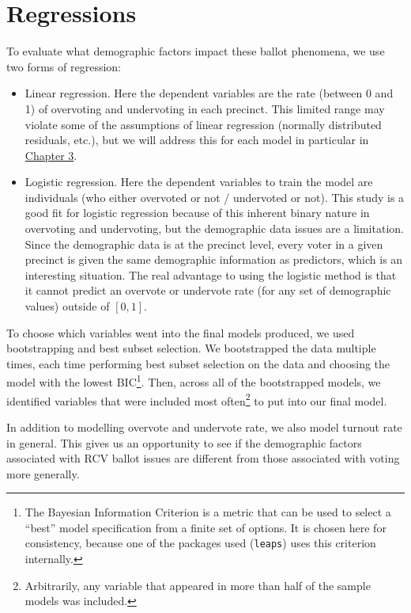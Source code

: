 \documentclass[12pt,twoside]{reedthesis}
\begin{document}
\hypertarget{regressions}{%
\section{Regressions}\label{regressions}}

To evaluate what demographic factors impact these ballot phenomena, we use two forms of regression:
\begin{itemize}
\item
  Linear regression. Here the dependent variables are the rate (between 0 and 1) of overvoting and undervoting in each precinct. This limited range may violate some of the assumptions of linear regression (normally distributed residuals, etc.), but we will address this for each model in particular in \protect\hyperlink{demo-results}{Chapter 3}.
\item
  Logistic regression. Here the dependent variables to train the model are individuals (who either overvoted or not / undervoted or not). This study is a good fit for logistic regression because of this inherent binary nature in overvoting and undervoting, but the demographic data issues are a limitation. Since the demographic data is at the precinct level, every voter in a given precinct is given the same demographic information as predictors, which is an interesting situation. The real advantage to using the logistic method is that it cannot predict an overvote or undervote rate (for any set of demographic values) outside of \([0,1]\).
\end{itemize}
To choose which variables went into the final models produced, we used bootstrapping and best subset selection. We bootstrapped the data multiple times, each time performing best subset selection on the data and choosing the model with the lowest BIC\footnote{The Bayesian Information Criterion is a metric that can be used to select a ``best'' model specification from a finite set of options. It is chosen here for consistency, because one of the packages used (\texttt{leaps}) uses this criterion internally.}. Then, across all of the bootstrapped models, we identified variables that were included most often\footnote{Arbitrarily, any variable that appeared in more than half of the sample models was included.} to put into our final model.

In addition to modelling overvote and undervote rate, we also model turnout rate in general. This gives us an opportunity to see if the demographic factors associated with RCV ballot issues are different from those associated with voting more generally.
\end{document}
